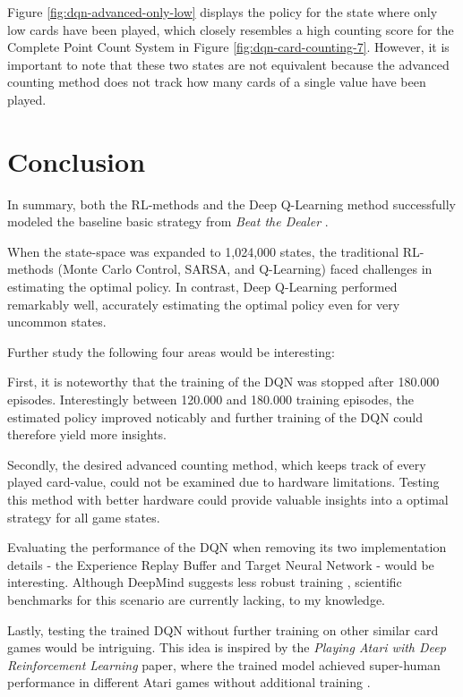 \documentclass[conference]{IEEEtran}
\begin{document}
Figure \ref{fig:dqn-advanced-only-low} displays the policy for the state where only low cards have been played, which closely resembles a high counting score for the Complete Point Count System in Figure \ref{fig:dqn-card-counting-7}. However, it is important to note that these two states are not equivalent because the advanced counting method does not track how many cards of a single value have been played.



\section{Conclusion}
In summary, both the RL-methods and the Deep Q-Learning method successfully modeled the baseline basic strategy from \textit{Beat the Dealer} \cite{b1}.

When the state-space was expanded to 1,024,000 states, the traditional RL-methods (Monte Carlo Control, SARSA, and Q-Learning) faced challenges in estimating the optimal policy. In contrast, Deep Q-Learning performed remarkably well, accurately estimating the optimal policy even for very uncommon states.

Further study the following four areas would be interesting:

First, it is noteworthy that the training of the DQN was stopped after 180.000 episodes. Interestingly between 120.000 and 180.000 training episodes, the estimated policy improved noticably and further training of the DQN could therefore yield more insights. 

Secondly, the desired advanced counting method, which keeps track of every played card-value, could not be examined due to hardware limitations. Testing this method with better hardware could provide valuable insights into a optimal strategy for all game states.

Evaluating the performance of the DQN when removing its two implementation details - the Experience Replay Buffer and Target Neural Network - would be interesting. Although DeepMind suggests less robust training \cite{b2}, scientific benchmarks for this scenario are currently lacking, to my knowledge.

Lastly, testing the trained DQN without further training on other similar card games would be intriguing. This idea is inspired by the \textit{Playing Atari with Deep Reinforcement Learning} paper, where the trained model achieved super-human performance in different Atari games without additional training \cite{b2}.
\end{document}
